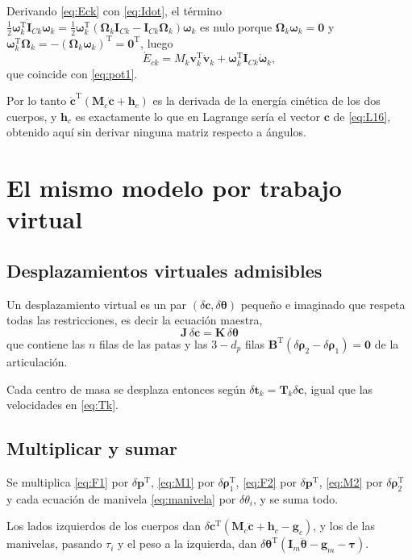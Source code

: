 \documentclass[11pt]{article}
\newcommand{\T}{^{\mathrm{T}}}
\newcommand{\pvec}{\mathbf{p}}
\newcommand{\wv}{\boldsymbol{\omega}}
\newcommand{\cd}{\dot{\mathbf{c}}}
\newcommand{\cdd}{\ddot{\mathbf{c}}}
\newcommand{\IC}[1]{\mathbf{I}_{C#1}}
\newcommand{\Om}{\boldsymbol{\Omega}}
\newcommand{\dth}{\delta\boldsymbol{\rho}}
\newcommand{\thv}{\boldsymbol{\theta}}
\newcommand{\tauv}{\boldsymbol{\tau}}
\begin{document}
Derivando \eqref{eq:Eck} con \eqref{eq:Idot}, el término $\tfrac12\wv_k\T\dot{\mathbf{I}}_{Ck}\wv_k=\tfrac12\wv_k\T(\Om_k\IC{k}-\IC{k}\Om_k)\wv_k$ es nulo porque $\Om_k\wv_k=\mathbf{0}$ y $\wv_k\T\Om_k=-(\Om_k\wv_k)\T=\mathbf{0}\T$, luego
\begin{equation}
\dot E_{ck}=M_k\mathbf{v}_k\T\dot{\mathbf{v}}_k+\wv_k\T\IC{k}\dot{\wv}_k ,
\label{eq:pot2}
\end{equation}
que coincide con \eqref{eq:pot1}.

Por lo tanto $\cd\T(\mathbf{M}_c\cdd+\mathbf{h}_c)$ es la derivada de la energía cinética de los dos cuerpos, y $\mathbf{h}_c$ es exactamente lo que en Lagrange sería el vector $\mathbf{c}$ de \eqref{eq:L16}, obtenido aquí sin derivar ninguna matriz respecto a ángulos.

\section{El mismo modelo por trabajo virtual}

\subsection{Desplazamientos virtuales admisibles}

Un desplazamiento virtual es un par $(\delta\mathbf{c},\delta\thv)$ pequeño e imaginado que respeta todas las restricciones, es decir la ecuación maestra,
\begin{equation}
\boxed{\ \mathbf{J}\,\delta\mathbf{c}=\mathbf{K}\,\delta\thv\ }
\label{eq:compat}
\end{equation}
que contiene las $n$ filas de las patas y las $3-d_p$ filas $\mathbf{B}\T(\dth_2-\dth_1)=\mathbf{0}$ de la articulación.

Cada centro de masa se desplaza entonces según $\delta\mathbf{t}_k=\mathbf{T}_k\delta\mathbf{c}$, igual que las velocidades en \eqref{eq:Tk}.

\subsection{Multiplicar y sumar}

Se multiplica \eqref{eq:F1} por $\delta\pvec\T$, \eqref{eq:M1} por $\dth_1\T$, \eqref{eq:F2} por $\delta\pvec\T$, \eqref{eq:M2} por $\dth_2\T$ y cada ecuación de manivela \eqref{eq:manivela} por $\delta\theta_i$, y se suma todo.

Los lados izquierdos de los cuerpos dan $\delta\mathbf{c}\T(\mathbf{M}_c\cdd+\mathbf{h}_c-\mathbf{g}_c)$, y los de las manivelas, pasando $\tau_i$ y el peso a la izquierda, dan $\delta\thv\T(\mathbf{I}_m\ddot{\thv}-\mathbf{g}_m-\tauv)$.
\end{document}
